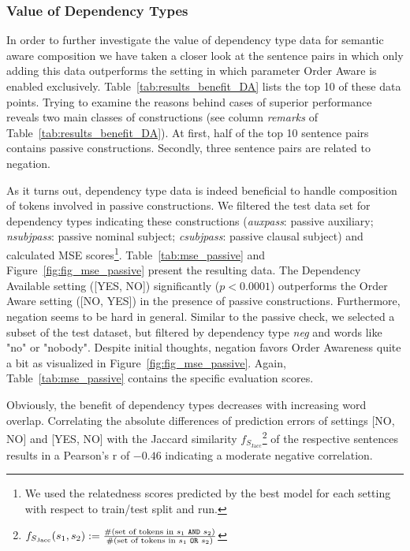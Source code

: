 
\subsubsection{Value of Dependency Types}
In order to further investigate the value of dependency type data for semantic aware composition we have taken a closer look at the sentence pairs in which only adding this data outperforms the setting in which parameter Order Aware is enabled exclusively. Table~\ref{tab:results_benefit_DA} lists the top 10 of these data points. Trying to examine the reasons behind cases of superior performance reveals two main classes of constructions (see column \textit{remarks} of Table~\ref{tab:results_benefit_DA}). At first, half of the top 10 sentence pairs contains passive constructions. Secondly, three sentence pairs are related to negation. 

As it turns out, dependency type data is indeed beneficial to handle composition of tokens involved in passive constructions. We filtered the test data set for dependency types indicating these constructions (\textit{auxpass}: passive auxiliary; \textit{nsubjpass}: passive nominal subject; \textit{csubjpass}: passive clausal subject) and calculated \ac{MSE} scores\footnote{We used the relatedness scores predicted by the best model for each setting with respect to train/test split and run.}. Table~\ref{tab:mse_passive} and Figure~\ref{fig:fig_mse_passive} present the resulting data. The Dependency Available setting ([YES, NO]) significantly ($p < 0.0001$) outperforms the Order Aware setting ([NO, YES]) in the presence of passive constructions. Furthermore, negation seems to be hard in general. Similar to the passive check, we selected a subset of the test dataset, but filtered by dependency type \textit{neg} and words like "no" or "nobody". Despite initial thoughts, negation favors Order Awareness quite a bit as visualized in Figure~\ref{fig:fig_mse_passive}. Again, Table~\ref{tab:mse_passive} contains the specific evaluation scores.

Obviously, the benefit of dependency types decreases with increasing word overlap. Correlating the absolute differences of prediction errors of settings [NO, NO] and [YES, NO] with the Jaccard similarity $f_{S_\text{Jacc}}$\footnote{$f_{S_\text{Jacc}}(s_1, s_2) := \frac{\text{\#(set of tokens in $s_1$ \texttt{AND} $s_2$)}}{\text{\#(set of tokens in $s_1$ \texttt{OR} $s_2$)}}$} of the respective sentences results in a Pearson's r of $-0.46$ indicating a moderate negative correlation.

